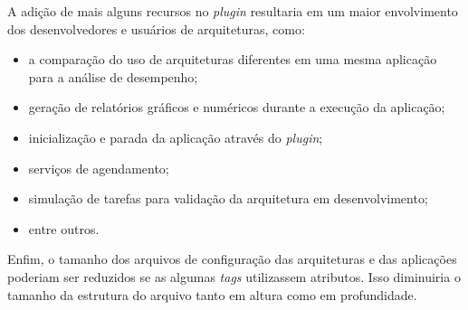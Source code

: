         A adição de mais alguns recursos no \textit{plugin} resultaria em um maior envolvimento dos desenvolvedores e usuários de arquiteturas, como:
        
        \begin{itemize}
            \item a comparação do uso de arquiteturas diferentes em uma mesma aplicação para a análise de desempenho;
            
            \item geração de relatórios gráficos e numéricos durante a execução da aplicação;
            
            \item inicialização e parada da aplicação através do \textit{plugin};
            
            \item serviços de agendamento;
            
            \item simulação de tarefas para validação da arquitetura em desenvolvimento;
            
            \item entre outros.
        \end{itemize}
        
        Enfim, o tamanho dos arquivos de configuração das arquiteturas e das aplicações poderiam ser reduzidos se as algumas \textit{tags} utilizassem atributos. Isso diminuiria o tamanho da estrutura do arquivo tanto em altura como em profundidade.